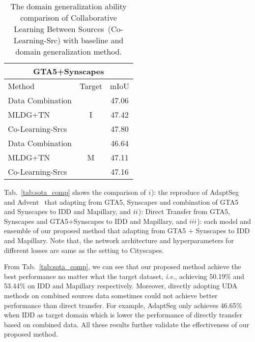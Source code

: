 \documentclass[final]{cvpr}
\def\ie{\textit{i.e.}}
\begin{document}
\begin{table}[t]
	\centering
	\caption{The domain generalization ability comparison of Collaborative Learning Between Sources~(Co-Learning-Src) with baseline and domain generalization method.}
	\label{Tab:DG_comp}
	\setlength{\tabcolsep}{5mm}
	\begin{tabular}{l|c|c}
		\hline
		\multicolumn{3}{c}{GTA5+Synscapes} \\
		\hline
		Method & Target & mIoU \\
		\hline
		Data Combination & \multirow{3}{*}{I} &  47.06\\
		MLDG+TN~\cite{zhang2020generalizable} & & 47.42\\
		Co-Learning-Srcs & & 47.80\\
		\hline
		Data Combination & \multirow{3}{*}{M} & 46.64\\
		MLDG+TN~\cite{zhang2020generalizable} & & 47.11\\
		Co-Learning-Srcs & & 47.16 \\
		\hline
	\end{tabular}
\end{table}

Tab.~\ref{tab:sota_comp} shows the comparison of $\romannumeral1$): the reproduce of AdaptSeg~\cite{tsai2018learning} and Advent~\cite{vu2019advent} that adapting from GTA5, Synscapes and combination of GTA5 and Synscapes to IDD and Mapillary, and $\romannumeral2$): Direct Transfer from GTA5, Synscapes and GTA5$+$Synscapes to IDD and Mapillary, and $\romannumeral3$): each model and ensemble of our proposed method that adapting from GTA5 $+$ Synscapes to IDD and Mapillary. Note that, the network architecture and hyperparameters for different losses are same as the setting to Cityscapes. 

From Tab.~\ref{tab:sota_comp}, we can see that our proposed method achieve the best performance no matter what the target dataset, \ie, achieving 50.19\% and 53.44\% on IDD and Mapillary respectively. Moreover, directly adopting UDA methods on combined sources data sometimes could not achieve better performance than direct transfer. For example, AdaptSeg only achieves 46.65\% when IDD as target domain which is lower the performance of directly transfer based on combined data. All these results further validate the effectiveness of our proposed method.
\end{document}
